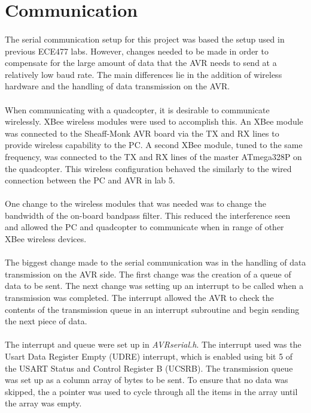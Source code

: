 \section{Communication}
\paragraph{}
The serial communication setup for this project was based the setup used in previous ECE477 labs. However, changes needed to be made in order to compensate for the large amount of data that the AVR  needs to send at a relatively low baud rate.  The main differences lie in the addition of wireless hardware and the handling of data transmission on the AVR.
\paragraph{}
When communicating with a quadcopter, it is desirable to communicate wirelessly. XBee wireless modules were used to accomplish this.  An XBee module was connected to the Sheaff-Monk AVR board via the TX and RX lines to provide wireless capability to the PC. A second XBee module, tuned to the same frequency, was connected to the TX and RX lines of the master ATmega328P on the quadcopter.  This wireless configuration behaved the similarly to the wired connection between the PC and AVR in lab 5.  
\paragraph{}
One change to the wireless modules that was needed was to change the bandwidth of the on-board bandpass filter.  This reduced the interference seen and allowed the PC and quadcopter to communicate when in range of other XBee wireless devices. 
\paragraph{}
The biggest change made to the serial communication was in the handling of data transmission on the AVR side.  The first change was the creation of a queue of data to be sent.  The next change was setting up an interrupt to be called when a transmission was completed.  The interrupt allowed the AVR to check the contents of the transmission queue in an interrupt subroutine and begin sending the next piece of data.
\paragraph{}
The interrupt and queue were set up in \textit{AVRserial.h}.  The interrupt used was the Usart Data Register Empty (UDRE) interrupt, which is enabled using bit 5 of the USART Status and Control Register B (UCSRB).  The transmission queue was set up as a column array of bytes to be sent.  To ensure that no data was skipped, the a pointer was used to cycle through all the items in the array until the array was empty.
